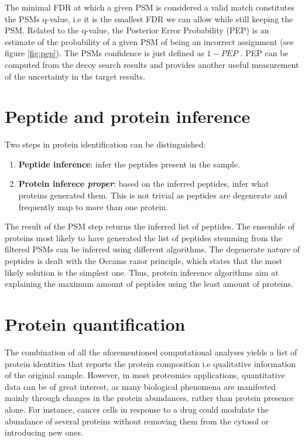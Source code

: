 \documentclass[11pt, a4paper]{report}
\begin{document}
The minimal FDR at which a given PSM is considered a valid match constitutes the PSM\textquotesingle s q-value, i.e it is the smallest FDR we can allow while still keeping the PSM. Related to the q-value, the Posterior Error Probability (PEP) is an estimate of the probability of a given PSM of being an incorrect assignment (see figure \ref{fig:pep}). The PSM\textquotesingle s confidence is just defined as $1-PEP$ \cite{Nesvizhskii2010}. PEP can be computed from the decoy search results and provides another useful measurement of the uncertainty in the target results.




\section{Peptide and protein inference}
\label{sec:inference}

Two steps in protein identification can be distinguished:

\begin{enumerate}

\item \textbf{Peptide inference}: infer the peptides present in the sample.
\item \textbf{Protein inferece \textit{proper}}: based on the inferred peptides, infer what proteins generated them. This is not trivial as peptides are degenerate and frequently map to more than one protein.
\end{enumerate}

The result of the PSM step returns the inferred list of peptides. The ensemble of proteins most likely to have generated the list of peptides stemming from the filtered PSMs can be inferred using different algorithms. The degenerate nature of peptides is dealt with the Occam\textquotesingle s razor principle, which states that the most likely solution is the simplest one. Thus, protein inference algorithms aim at explaining the maximum amount of peptides using the least amount of proteins.

\section{Protein quantification}
\label{sec:quantification}

The combination of all the aforementioned computational analyses yields a list of protein identities that reports the protein composition i.e qualitative information of the original sample. However, in most proteomics applications, quantitative data can be of great interest, as many biological phenomena are manifested mainly through changes in the protein abundances, rather than protein presence alone. For instance, cancer cells in response to a drug could modulate the abundance of several proteins without removing them from the cytosol or introducing new ones.
\end{document}
